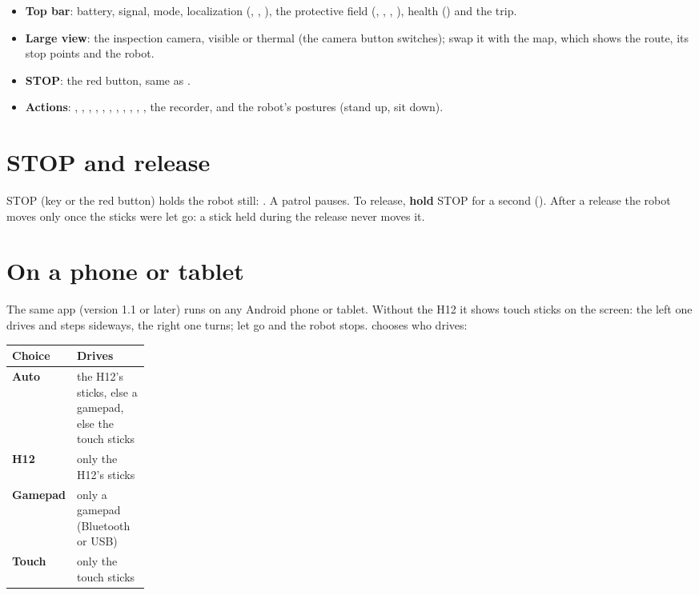 \begin{itemize}
  \item \textbf{Top bar}: battery, signal, mode, localization (, ,
    ), the protective field (, , ,
    ), health () and the trip.
  \item \textbf{Large view}: the inspection camera, visible or thermal (the camera button
    switches); swap it with the map, which shows the route, its stop points and the robot.
  \item \textbf{STOP}: the red button, same as .
  \item \textbf{Actions}: , , , , ,
    , , , , , , the recorder, and
    the robot's postures (stand up, sit down).
\end{itemize}

\section{STOP and release}

STOP (key  or the red button) holds the robot still: . A patrol pauses. To release, \textbf{hold} STOP for a second ().
After a release the robot moves only once the sticks were let go: a stick held during the
release never moves it.

\section{On a phone or tablet}

The same app (version 1.1 or later) runs on any Android phone or tablet. Without the H12 it shows
touch sticks on the screen: the left one drives and steps sideways, the right one turns; let go
and the robot stops.  chooses who drives:

\begin{center}
\begin{tabularx}{\linewidth}{@{}>{\bfseries}p{0.2\linewidth}X@{}}
  \toprule
  Choice & Drives \\
  \midrule
  Auto & the H12's sticks, else a gamepad, else the touch sticks \\
  H12 & only the H12's sticks \\
  Gamepad & only a gamepad (Bluetooth or USB) \\
  Touch & only the touch sticks \\
  \bottomrule
\end{tabularx}
\end{center}

